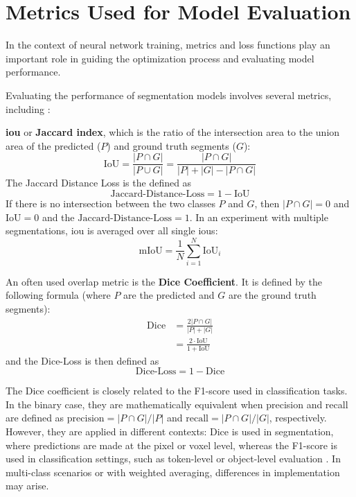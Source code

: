 \section{Metrics Used for Model Evaluation}
In the context of neural network training, metrics and loss functions play an important role in guiding the optimization process and evaluating model performance. 

\medskip

\noindent Evaluating the performance of segmentation models involves several metrics, including \cite{azad2023lossfunctionserasemantic}:

\medskip

{\bf \gls{iou}} or {\bf Jaccard index}, which is the ratio of the intersection area to the union area of the predicted ($P$) and ground truth segments ($G$): 
\begin{equation}
	\text{IoU} = \frac{\left| P \cap G \right|}{\left| P \cup G \right|} = \frac{\left| P \cap G \right|}{\left| P \right| + \left| G \right| - \left| P \cap G \right|}
\end{equation}
The Jaccard Distance Loss is the defined as
\begin{equation}
	\text{Jaccard-Distance-Loss} = 1 - \text{IoU}
\end{equation} 
If there is no intersection between the two classes $P$ and $G$, then $\left| P \cap G \right| = 0$ and $\text{IoU}=0$ and the $\text{Jaccard-Distance-Loss} = 1$. In an experiment with multiple segmentations, \gls{iou} is averaged over all single \glspl{iou}: 
\begin{equation}
	\text{mIoU} = \frac{1}{N} \sum_{i=1}^N \text{IoU}_i
\end{equation}

\medskip

An often used overlap metric is the {\bf Dice Coefficient}. It is defined by the following formula (where $P$ are the predicted and $G$ are the ground truth segments):
\begin{align}
	\text{Dice} &= \frac{2 \left| P \cap G \right|}{\left| P \right| + \left| G \right|} \\
	&= \frac{2 \cdot \text{IoU}}{1 + \text{IoU}}
\end{align}
and the Dice-Loss is then defined as 
\begin{equation}
	\text{Dice-Loss} = 1 - \text{Dice}
\end{equation} 

The Dice coefficient is closely related to the F1-score used in classification tasks. In the binary case, they are mathematically equivalent when precision and recall are defined as $\text{precision} = {|P \cap G|}/{|P|}$ and $\text{recall} = {|P \cap G|}/{|G|}$, respectively. However, they are applied in different contexts: Dice is used in segmentation, where predictions are made at the pixel or voxel level, whereas the F1-score is used in classification settings, such as token-level or object-level evaluation \cite{taha2015metrics, saito2015precision}. In multi-class scenarios or with weighted averaging, differences in implementation may arise.

